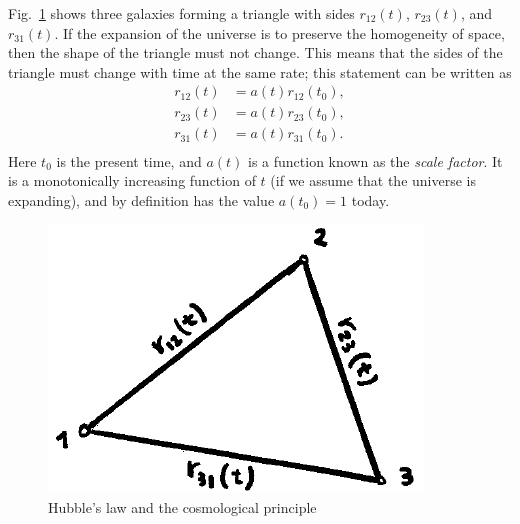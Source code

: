 Fig.\ \ref{fig:lec4_8} shows three galaxies forming a triangle with sides $r_{12}(t)$, $r_{23}(t)$, and $r_{31}(t)$. If the expansion of the universe is to preserve the homogeneity of space, then the shape of the triangle must not change. This means that the sides of the triangle must change with time at the same rate; this statement can be written as
\begin{equation}
\begin{split}
r_{12}(t)&=a(t)r_{12}(t_0),\\
r_{23}(t)&=a(t)r_{23}(t_0),\\
r_{31}(t)&=a(t)r_{31}(t_0).\\
\end{split}
\end{equation}
Here $t_0$ is the present time, and $a(t)$ is a function known as the {\it scale factor}. It is a monotonically increasing function of $t$ (if we assume that the universe is expanding), and by definition has the value $a(t_0)=1$ today.
\begin{figure}[ht]
\begin{center}
\includegraphics[scale=0.6]{Draw/lec4_8.png}
\end{center}
\caption{Hubble's law and the cosmological principle}
\label{fig:lec4_8}
\end{figure}

